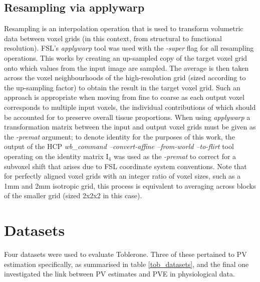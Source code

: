 \documentclass[12pt]{report}
\newcommand{\mat}[1]{\mathrm{#1}}
\begin{document}
\subsection*{Resampling via applywarp}
\label{applywarp}
Resampling is an interpolation operation that is used to transform volumetric data between voxel grids (in this context, from structural to functional resolution). FSL’s \textit{applywarp} tool was used with the \textit{-super} flag for all resampling operations. This works by creating an up-sampled copy of the target voxel grid onto which values from the input image are sampled. The average is then taken across the voxel neighbourhoods of the high-resolution grid (sized according to the up-sampling factor) to obtain the result in the target voxel grid. Such an approach is appropriate when moving from fine to coarse as each output voxel corresponds to multiple input voxels, the individual contributions of which should be accounted for to preserve overall tissue proportions. When using \textit{applywarp} a transformation matrix between the input and output voxel grids must be given as the \textit{-premat} argument; to denote identity for the purposes of this work, the output of the HCP \textit{wb\_command –convert-affine –from-world –to-flirt} tool operating on the identity matrix $\mat{I}_4$ was used as the \textit{-premat} to correct for a subvoxel shift that arises due to FSL coordinate system conventions. Note that for perfectly aligned voxel grids with an integer ratio of voxel sizes, such as a 1mm and 2mm isotropic grid, this process is equivalent to averaging across blocks of the smaller grid (sized 2x2x2 in this case).

\section{Datasets}

Four datasets were used to evaluate Toblerone. Three of these pertained to PV estimation specifically, as summarised in table \ref{tob_datasets}, and the final one investigated the link between PV estimates and PVE in physiological data.
\end{document}
